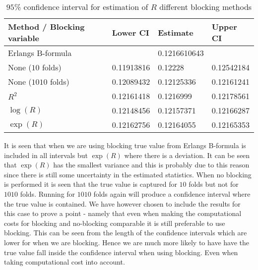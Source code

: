 \begin{table}[H]
\centering
\begin{tabular}{|l|l|l|l|}
\hline
 Method / Blocking variable & Lower CI & Estimate & Upper CI  \\ \hline
 Erlangs B-formula & & 0.1216610643 & \\ \hline
 None ($10$ folds) &0.11913816 & 0.12228 & 0.12542184\\ \hline
 None ($1010$ folds) & 0.12089432 & 0.12125336 & 0.12161241\\ \hline
 $R^2$ & 0.12161418 & 0.1216999 & 0.12178561\\ \hline
 $\log(R)$ & 0.12148456 & 0.12157371 & 0.12166287 \\  \hline
 $\exp(R)$ & 0.12162756 & 0.12164055 & 0.12165353 \\ \hline
\end{tabular}
\caption{ $95$\% confidence interval for estimation of $R$ different blocking methods}
\label{tab:week53}
\end{table}
It is seen that when we are using blocking true value from Erlangs B-formula is included in all intervals but $\exp(R)$ where there is a deviation. It can be seen that $\exp(R)$ has the smallest variance and this is probably due to this reason since there is still some uncertainty in the estimated statistics. When no blocking is performed it is seen that the true value is captured for $10$ folds but not for $1010$ folds. Running for $1010$ folds again will produce a confidence interval where the true value is contained. We have however chosen to include the results for this case to prove a point - namely that even when making the computational costs for blocking and no-blocking comparable it is still preferable to use blocking. This can be seen from the length of the confidence intervals which are lower for when we are blocking. Hence we are much more likely to have have the true value fall inside the confidence interval when using blocking. Even when taking computational cost into account. 